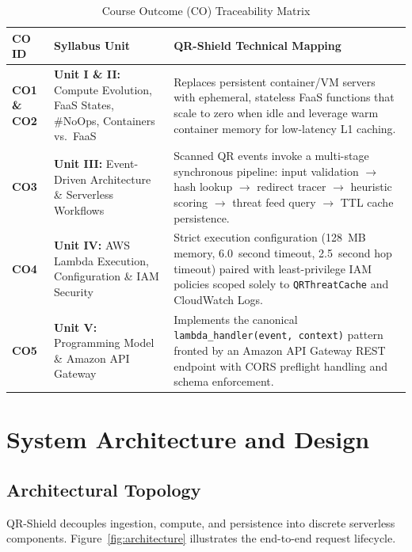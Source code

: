 \documentclass[12pt,a4paper]{report}
\begin{document}
\begin{table}[htbp]
\centering
\caption{Course Outcome (CO) Traceability Matrix}
\label{tab:co_traceability}
\begin{tabularx}{\textwidth}{l p{4.5cm} X}
\toprule
\textbf{CO ID} & \textbf{Syllabus Unit} & \textbf{QR-Shield Technical Mapping} \\
\midrule
\textbf{CO1 \& CO2} & \textbf{Unit I \& II:} Compute Evolution, FaaS States, \#NoOps, Containers vs.\ FaaS & Replaces persistent container/VM servers with ephemeral, stateless FaaS functions that scale to zero when idle and leverage warm container memory for low-latency L1 caching. \\
\addlinespace
\textbf{CO3} & \textbf{Unit III:} Event-Driven Architecture \& Serverless Workflows & Scanned QR events invoke a multi-stage synchronous pipeline: input validation $\rightarrow$ hash lookup $\rightarrow$ redirect tracer $\rightarrow$ heuristic scoring $\rightarrow$ threat feed query $\rightarrow$ TTL cache persistence. \\
\addlinespace
\textbf{CO4} & \textbf{Unit IV:} AWS Lambda Execution, Configuration \& IAM Security & Strict execution configuration (128~MB memory, 6.0~second timeout, 2.5~second hop timeout) paired with least-privilege IAM policies scoped solely to \texttt{QRThreatCache} and CloudWatch Logs. \\
\addlinespace
\textbf{CO5} & \textbf{Unit V:} Programming Model \& Amazon API Gateway & Implements the canonical \texttt{lambda\_handler(event, context)} pattern fronted by an Amazon API Gateway REST endpoint with CORS preflight handling and schema enforcement. \\
\bottomrule
\end{tabularx}
\end{table}

\chapter{System Architecture and Design}

\section{Architectural Topology}
QR-Shield decouples ingestion, compute, and persistence into discrete serverless components. Figure~\ref{fig:architecture} illustrates the end-to-end request lifecycle.
\end{document}
